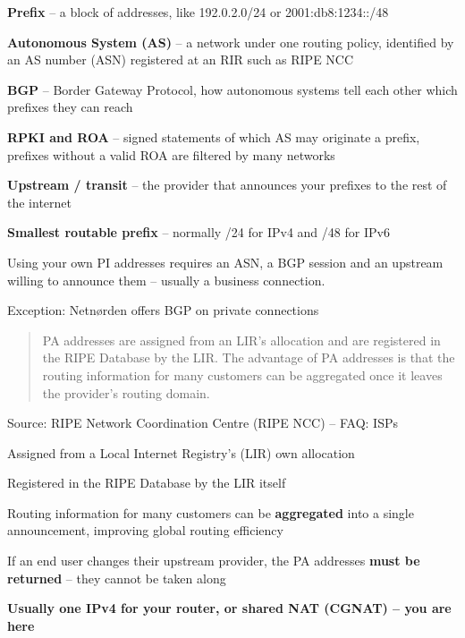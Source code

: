 \documentclass[Screen16to9,17pt]{foils}
\begin{document}
\begin{list2}
\item {\bf Prefix} -- a block of addresses, like 192.0.2.0/24 or 2001:db8:1234::/48
\item {\bf Autonomous System (AS)} -- a network under one routing policy, identified by an AS number (ASN) registered at an RIR such as RIPE NCC
\item {\bf BGP} -- Border Gateway Protocol, how autonomous systems tell each other which prefixes they can reach
\item {\bf RPKI and ROA} -- signed statements of which AS may originate a prefix, prefixes without a valid ROA are filtered by many networks
\item {\bf Upstream / transit} -- the provider that announces your prefixes to the rest of the internet
\item {\bf Smallest routable prefix} -- normally /24 for IPv4 and /48 for IPv6
\item Using your own PI addresses requires an ASN, a BGP session and an upstream willing to announce them -- usually a business connection.
\item Exception: Netnørden offers BGP on private connections 
\end{list2}



\begin{quote}
PA addresses are assigned from an LIR's allocation and are registered in the RIPE Database
by the LIR. The advantage of PA addresses is that the routing information for many customers
can be aggregated once it leaves the provider's routing domain.
\end{quote}
Source: RIPE Network Coordination Centre (RIPE NCC) -- FAQ: ISPs\\

\begin{list2}
\item Assigned from a Local Internet Registry's (LIR) own allocation
\item Registered in the RIPE Database by the LIR itself
\item Routing information for many customers can be {\bf aggregated} into a single announcement, improving global routing efficiency
\item If an end user changes their upstream provider, the PA addresses {\bf must be returned} -- they cannot be taken along
\item {\bf Usually one IPv4 for your router, or shared NAT (CGNAT) -- you are here}
\end{list2}
\end{document}
